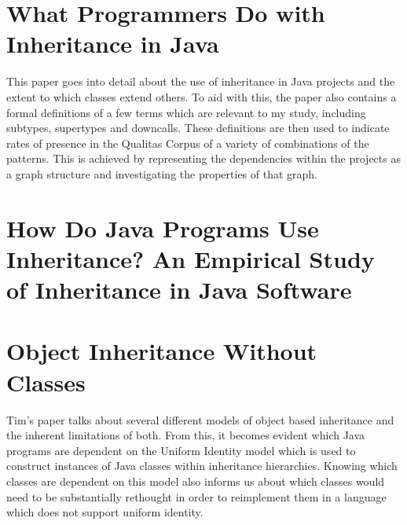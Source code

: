 \section{What Programmers Do with Inheritance in Java~\cite{InheritanceInJava}}
This paper goes into detail about the use of inheritance in Java projects and the extent to which classes extend others. To aid with this, the paper also contains a formal definitions of a few terms which are relevant to my study, including subtypes, supertypes and downcalls. These definitions are then used to indicate rates of presence in the Qualitas Corpus of a variety of combinations of the patterns. This is achieved by representing the dependencies within the projects as a graph structure and investigating the properties of that graph.

\section{How Do Java Programs Use Inheritance? An Empirical Study of Inheritance in Java Software~\cite{HowProgramsUseInheritance}}


\section{Object Inheritance Without Classes~\cite{InheritanceWithoutClasses}}
Tim's paper talks about several different models of object based inheritance and the inherent limitations of both. From this, it becomes evident which Java programs are dependent on the Uniform Identity model which is used to construct instances of Java classes within inheritance hierarchies. Knowing which classes are dependent on this model also informs us about which classes would need to be substantially rethought in order to reimplement them in a language which does not support uniform identity.
